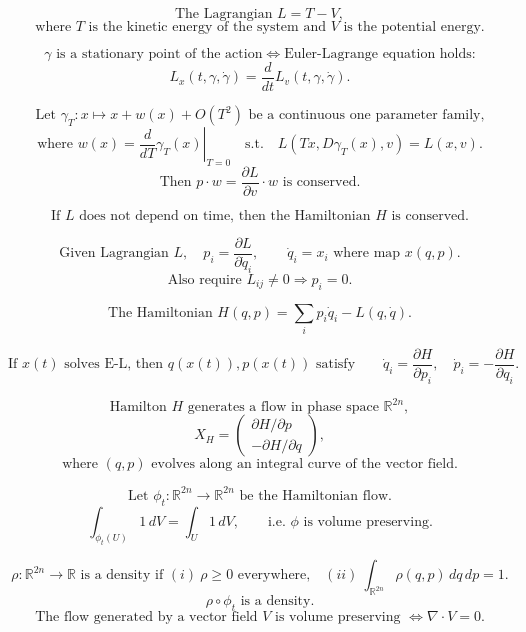 \documentclass[11pt]{article}
\begin{document}
\newpage


\[
\text{The Lagrangian }L=T-V,
\]
\[
\text{where }T\text{ is the kinetic energy of the system and }V
\text{ is the potential energy.}
\]

\[
\gamma\text{ is a stationary point of the action}
\Longleftrightarrow
\text{Euler-Lagrange equation holds:}
\]
\[
L_x(t,\gamma,\dot\gamma)=\frac{d}{dt}L_v(t,\gamma,\dot\gamma).
\]

\[
\text{Let }\gamma_T:x\mapsto x+w(x)+O(T^2)
\text{ be a continuous one parameter family,}
\]
\[
\text{where }w(x)=\left.\frac{d}{dT}\gamma_T(x)\right|_{T=0}
\quad\text{s.t.}\quad
L(Tx,D\gamma_T(x),v)=L(x,v).
\]
\[
\text{Then }p\cdot w=\frac{\partial L}{\partial v}\cdot w
\text{ is conserved.}
\]

\[
\text{If }L\text{ does not depend on time, then the Hamiltonian }H
\text{ is conserved.}
\]

\newpage


\[
\text{Given Lagrangian }L,\quad p_i=\frac{\partial L}{\partial \dot q_i},
\qquad \dot q_i=x_i\text{ where map }x(q,p).
\]
\[
\text{Also require }L_{ij}\ne0\Rightarrow p_i=0.
\]

\[
\text{The Hamiltonian }H(q,p)=\sum_i p_i\dot q_i-L(q,\dot q).
\]

\[
\text{If }x(t)\text{ solves E-L, then }q(x(t)),p(x(t))
\text{ satisfy}
\qquad
\dot q_i=\frac{\partial H}{\partial p_i},\quad
\dot p_i=-\frac{\partial H}{\partial q_i}.
\]

\[
\text{Hamilton }H\text{ generates a flow in phase space }\mathbb R^{2n},
\]
\[
X_H=\begin{pmatrix}\partial H/\partial p\\ -\partial H/\partial q\end{pmatrix},
\]
\[
\text{where }(q,p)\text{ evolves along an integral curve of the vector field.}
\]

\[
\text{Let }\phi_t:\mathbb R^{2n}\to\mathbb R^{2n}\text{ be the Hamiltonian flow.}
\]
\[
\int_{\phi_t(U)}1\,dV=\int_U1\,dV,\qquad
\text{i.e. }\phi\text{ is volume preserving.}
\]

\[
\rho:\mathbb R^{2n}\to\mathbb R
\text{ is a density if }(i)\ \rho\ge0\text{ everywhere,}\quad
(ii)\ \int_{\mathbb R^{2n}}\rho(q,p)\,dq\,dp=1.
\]
\[
\rho\circ\phi_t\text{ is a density.}
\]
\[
\text{The flow generated by a vector field }V
\text{ is volume preserving }\Longleftrightarrow \nabla\cdot V=0.
\]
\end{document}
